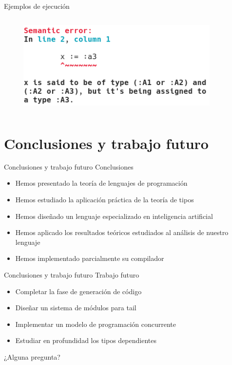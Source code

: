 \documentclass[compress]{beamer}
\begin{document}
\begin{frame}[fragile]{Ejemplos de ejecución}
\begin{columns}
\begin{column}{0.47\paperwidth}
			\begin{figure}[h]
				\begin{center}
					\hspace*{-0.8cm}
					\includegraphics[width=0.9\textwidth]{img/int2.png}
				\end{center}
			\end{figure}
		\end{column}
	\end{columns}
\end{frame}

\section{Conclusiones y trabajo futuro}

\begin{frame}{Conclusiones y trabajo futuro}
	{Conclusiones}
	\begin{itemize}
		\item Hemos presentado la teoría de lenguajes de programación
		\bigskip
		\item Hemos estudiado la aplicación práctica de la teoría de tipos
		\bigskip
		\item Hemos diseñado un lenguaje especializado en inteligencia artificial
		\bigskip
		\item Hemos aplicado los resultados teóricos estudiados al análisis de nuestro lenguaje
		\bigskip
		\item Hemos implementado parcialmente su compilador
	\end{itemize}
\end{frame}

\begin{frame}{Conclusiones y trabajo futuro}
	{Trabajo futuro}
	\begin{itemize}
		\item Completar la fase de generación de código
		\bigskip
		\item Diseñar un sistema de módulos para tail
		\bigskip
		\item Implementar un modelo de programación concurrente
		\bigskip
		\item Estudiar en profundidad los tipos dependientes
	\end{itemize}
\end{frame}

\begin{frame}
	\Huge \centering ¿Alguna pregunta?
\end{frame}
\end{document}
